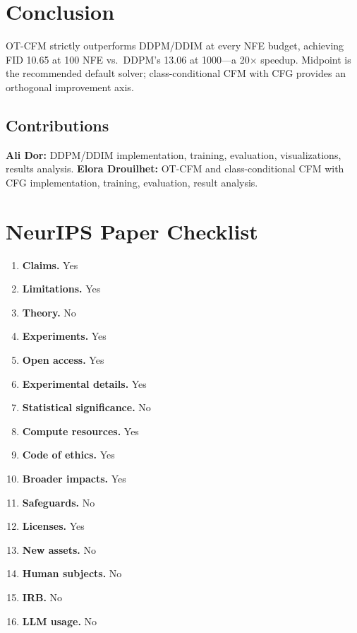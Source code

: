 \documentclass[10pt]{article}
\begin{document}
\section{Conclusion}


OT-CFM strictly outperforms DDPM/DDIM at every NFE budget, achieving FID 10.65 at 100 NFE vs.\ DDPM's 13.06 at 1000---a 20$\times$ speedup.
Midpoint is the recommended default solver; class-conditional CFM with CFG provides an orthogonal improvement axis.


\subsection*{Contributions}
\textbf{Ali Dor:} DDPM/DDIM implementation, training, evaluation, visualizations, results analysis.
\textbf{Elora Drouilhet:} OT-CFM and class-conditional CFM with CFG implementation, training, evaluation, result analysis.

{\small


}

\section*{NeurIPS Paper Checklist}
\small
\begin{enumerate}[leftmargin=1.5em]
\item \textbf{Claims.} Yes
\item \textbf{Limitations.} Yes
\item \textbf{Theory.} No
\item \textbf{Experiments.} Yes
\item \textbf{Open access.} Yes
\item \textbf{Experimental details.} Yes
\item \textbf{Statistical significance.} No
\item \textbf{Compute resources.} Yes
\item \textbf{Code of ethics.} Yes
\item \textbf{Broader impacts.} Yes
\item \textbf{Safeguards.} No
\item \textbf{Licenses.} Yes
\item \textbf{New assets.} No
\item \textbf{Human subjects.} No
\item \textbf{IRB.} No
\item \textbf{LLM usage.} No
\end{enumerate}
\end{document}
